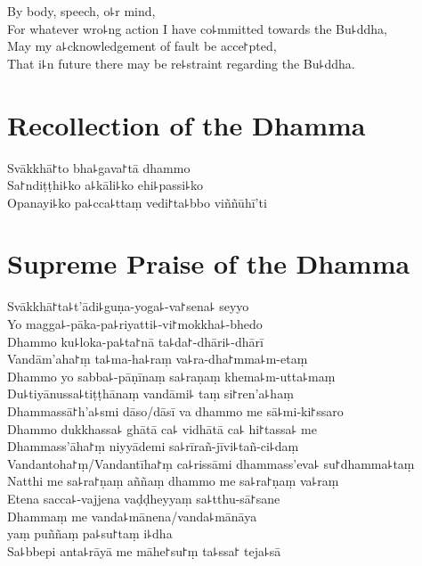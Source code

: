 By body, speech, o꜕r mind,\\
For whatever wro꜕ng action I have co꜕mmitted towards the Bu꜕ddha,\\
May my a꜕cknowledgement of fault be acce꜓pted,\\
That i꜕n future there may be re꜕straint regarding the Bu꜕ddha.

\clearpage

\chapter*{Recollection of the Dhamma}%

\delegateSetUseNext

\begin{leader}
\end{leader}

Svākkhā꜓to bha꜕gava꜓tā dhammo\\
Sa꜓ndiṭṭhi꜕ko a꜕kāli꜕ko ehi꜕passi꜕ko\\
Opanayi꜕ko pa꜕cca꜕ttaṃ vedi꜓ta꜕bbo viññūhī'ti

\chapter*{Supreme Praise of the Dhamma}%

\begin{leader}
\end{leader}

Svākkhā꜓ta꜕t'ādi꜕guṇa-yoga꜕-va꜓sena꜕ seyyo\\
Yo magga꜕-pāka-pa꜕riyatti꜕-vi꜓mokkha꜕-bhedo\\
Dhammo ku꜕loka-pa꜕ta꜓nā ta꜕da꜓-dhāri꜕-dhārī\\
Vandām'aha꜓ṃ ta꜕ma-ha꜕raṃ va꜕ra-dha꜓mma꜕m-etaṃ\\
Dhammo yo sabba꜕-pāṇīnaṃ sa꜕raṇaṃ khema꜕m-utta꜕maṃ\\
Du꜕tiyānussa꜕tiṭṭhānaṃ vandāmi꜕ taṃ si꜓ren'a꜕haṃ\\
Dhammassā꜓h'a꜕smi dāso/dāsī va dhammo me sā꜕mi-ki꜓ssaro\\
Dhammo dukkhassa꜕ ghātā ca꜕ vidhātā ca꜕ hi꜓tassa꜕ me\\
Dhammass'āha꜓ṃ niyyādemi sa꜕rīrañ-jīvi꜕tañ-ci꜕daṃ\\
Vandantoha꜓ṃ/Vandantīha꜓ṃ ca꜕rissāmi dhammass'eva꜕ su꜓dhamma꜕taṃ\\
Natthi me sa꜕ra꜓ṇaṃ aññaṃ dhammo me sa꜕ra꜓ṇaṃ va꜕raṃ\\
Etena sacca꜕-vajjena vaḍḍheyyaṃ sa꜕tthu-sā꜓sane\\
Dhammaṃ me vanda꜕mānena/vanda꜕mānāya\\
\vin yaṃ puññaṃ pa꜕su꜓taṃ i꜕dha\\
Sa꜕bbepi anta꜕rāyā me māhe꜓su꜓ṃ ta꜕ssa꜓ teja꜕sā

